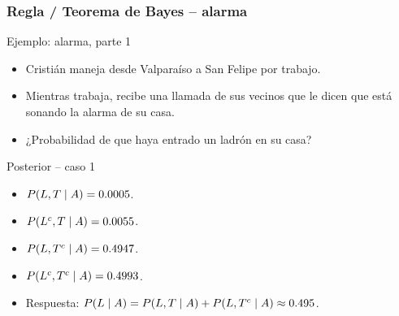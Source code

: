 \documentclass[table]{beamer}
\begin{document}
\begin{frame}
    \frametitle{Regla / Teorema de Bayes -- alarma}
    \begin{block}{Ejemplo: alarma, parte 1}
        \begin{itemize}
            \item Cristián maneja desde Valparaíso a San Felipe por trabajo.
            \item Mientras trabaja, recibe una llamada de sus vecinos que le dicen que está sonando la alarma de su casa.
            \item ¿Probabilidad de que haya entrado un ladrón en su casa?
        \end{itemize}
    \end{block}
    \begin{block}{Posterior -- caso 1}
        \begin{itemize}
            \item $\prob{L, T \mid A} = 0.0005$.
            \item $\prob{L^{c}, T \mid A} = 0.0055$.
            \item $\prob{L, T^{c} \mid A} = 0.4947$.
            \item $\prob{L^{c}, T^{c} \mid A} = 0.4993$.
            \item Respuesta: $\prob{L \mid A} = \prob{L, T \mid A} + \prob{L, T^{c} \mid A} \approx 0.495$.
        \end{itemize}
    \end{block}
\end{frame}
\end{document}
